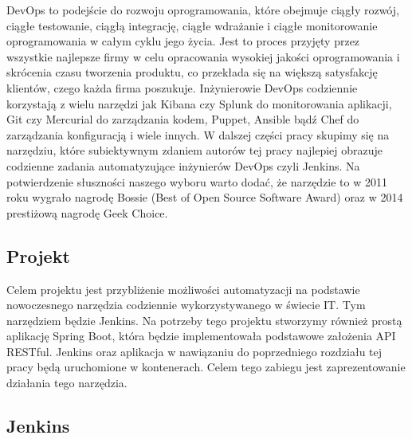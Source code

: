 DevOps to podejście do rozwoju oprogramowania, które obejmuje ciągły rozwój, ciągłe testowanie, ciągłą integrację, ciągłe wdrażanie i ciągłe monitorowanie oprogramowania w całym cyklu jego życia. Jest to proces przyjęty przez wszystkie najlepsze firmy w celu opracowania wysokiej jakości oprogramowania i skrócenia czasu tworzenia produktu, co przekłada się na większą satysfakcję klientów, czego każda firma poszukuje.
Inżynierowie DevOps codziennie korzystają z wielu narzędzi jak Kibana czy Splunk do monitorowania aplikacji, Git czy Mercurial do zarządzania kodem, Puppet, Ansible bądź Chef do zarządzania konfiguracją i wiele innych. 
W dalszej części pracy skupimy się na narzędziu, które subiektywnym zdaniem autorów tej pracy najlepiej obrazuje codzienne zadania automatyzujące inżynierów DevOps czyli Jenkins.
Na potwierdzenie słuszności naszego wyboru warto dodać, że narzędzie to w 2011 roku wygrało nagrodę Bossie (Best of Open Source Software Award) oraz w 2014 prestiżową nagrodę Geek Choice.  

\subsection{Projekt}

Celem projektu jest przybliżenie możliwości automatyzacji na podstawie nowoczesnego narzędzia codziennie wykorzystywanego w świecie IT. Tym narzędziem będzie Jenkins. 
Na potrzeby tego projektu stworzymy również prostą aplikację Spring Boot, która będzie implementowała podstawowe założenia API RESTful. Jenkins oraz aplikacja w nawiązaniu do poprzedniego rozdziału tej pracy będą uruchomione w kontenerach. Celem tego zabiegu jest zaprezentowanie działania tego narzędzia. 

\subsection{Jenkins}

